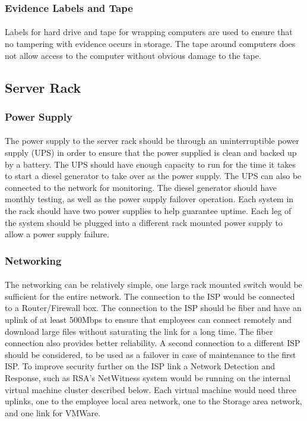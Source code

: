 \documentclass[12pt]{article}
\begin{document}
\subsubsection{Evidence Labels and Tape}
\paragraph{}
Labels for hard drive and tape for wrapping computers are used to ensure that no tampering with evidence occurs in storage. 
The tape around computers does not allow access to the computer without obvious damage to the tape. 

\subsection{Server Rack}
\subsubsection{Power Supply}
\paragraph{}
The power supply to the server rack should be through an uninterruptible power supply (UPS) in order to ensure that the power supplied is clean and backed up by a battery.
The UPS should have enough capacity to run for the time it takes to start a diesel generator to take over as the power supply.
The UPS can also be connected to the network for monitoring.  
The diesel generator should have monthly testing, as well as the power supply failover operation.
Each system in the rack should have two power supplies to help guarantee uptime.
Each leg of the system should be plugged into a different rack mounted power supply to allow a power supply failure.
 
\subsubsection{Networking}
\paragraph{}
The networking can be relatively simple, one large rack mounted switch would be sufficient for the entire network.
The connection to the ISP would be connected to a Router/Firewall box.
The connection to the ISP should be fiber and have an uplink of at least 500Mbps to ensure that employees can connect remotely and download large files without saturating the link for a long time.
The fiber connection also provides better reliability.
A second connection to a different ISP should be considered, to be used as a failover in case of maintenance to the first ISP.
To improve security further on the ISP link a Network Detection and Response, such as RSA's NetWitness system would be running on the internal virtual machine cluster described below.
Each virtual machine would need three uplinks, one to the employee local area network, one to the Storage area network, and one link for VMWare.
\end{document}

